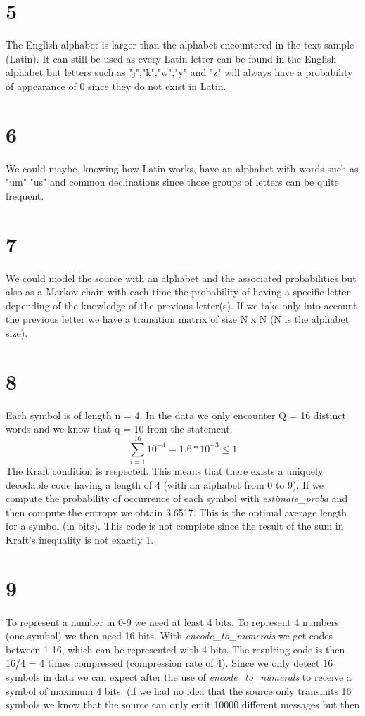 \documentclass[a4paper,12pt]{article}
\begin{document}
\section*{5}
The English alphabet is larger than the alphabet encountered in the text sample (Latin). It can still be used as every Latin letter can be found in the English alphabet but letters such as "j","k","w","y" and "z" will always have a probability of appearance of 0 since they do not exist in Latin.

\section*{6}
We could maybe, knowing how Latin works, have an alphabet with words such as "um" "us" and common declinations since those groups of letters can be quite frequent.

\section*{7}
We could model the source with an alphabet and the associated probabilities but also as a Markov chain with each time the probability of having a specific letter depending of the knowledge of the previous letter(s). If we take only into account the previous letter we have a transition matrix of size N x N (N is the alphabet size).  
\section*{8}
Each symbol is of length n = 4. In the data we only encounter Q = 16 distinct words and we know that q = 10 from the statement. 
\begin{equation}
\sum_{i=1}^{16} 10^{-4} = 1.6*10^{-3} \leq 1
\end{equation} 
The Kraft condition is respected. This means that there exists a uniquely decodable code having a length of 4 (with an alphabet from 0 to 9).
If we compute the probability of occurrence of each symbol with \textit{estimate\_proba} and then compute the entropy we obtain 3.6517. This is the optimal average length for a symbol (in bits). This code is not complete since the result of the sum in Kraft's inequality is not exactly 1.

\section*{9}
To represent a number in 0-9 we need at least 4 bits. To represent 4 numbers (one symbol) we then need 16 bits. With \textit{encode\_to\_numerals} we get codes between 1-16, which can be represented with 4 bits. The resulting code is then 16/4 = 4 times compressed (compression rate of 4). Since we only detect 16 symbols in data we can expect after the use of \textit{encode\_to\_numerals} to receive a symbol of maximum 4 bits. (if we had no idea that the source only transmits 16 symbols we know that the source can only emit 10000 different messages but then  
\end{document}
